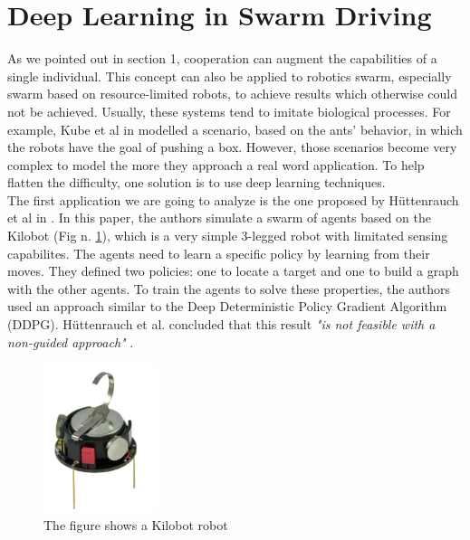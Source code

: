 \documentclass[conference]{IEEEtran}
\begin{document}
\section{Deep  Learning in Swarm Driving}
As we pointed out in section 1, cooperation can augment the capabilities of a single individual. This concept can also be applied to robotics swarm, especially swarm based on resource-limited robots, to achieve results which otherwise could not be achieved. Usually, these systems tend to imitate biological processes. For example,  Kube et al in \cite{KUBE200085} modelled a scenario, based on the ants' behavior,  in which the robots have the goal of pushing a box. However, those scenarios become very complex to model the more they approach a real word application. To help flatten the difficulty, one solution is to use deep learning techniques. \\
The first application we are going to analyze is the one proposed by Hüttenrauch et al in \cite{guided}. In this paper, the authors simulate a swarm of agents based on the Kilobot (Fig n. \ref{fig:kilobot}), which is a very simple 3-legged robot with limitated sensing capabilites. 
The agents need to learn a specific policy by learning from their moves. 
They defined two policies: one to locate a target and one to build a graph with the other agents. To train the agents to solve these properties, the authors used an approach similar to the Deep Deterministic Policy Gradient Algorithm (DDPG). Hüttenrauch et al. concluded that this result \textit{"is not feasible with a non-guided approach"} \cite{guided}.\\
\begin{figure}[htb]
    \centering
    \includegraphics[width=0.3\textwidth]{img/Kilobot.png}
    \caption{The figure shows a Kilobot robot \cite{guided} }
    \label{fig:kilobot}
\end{figure}
\end{document}
